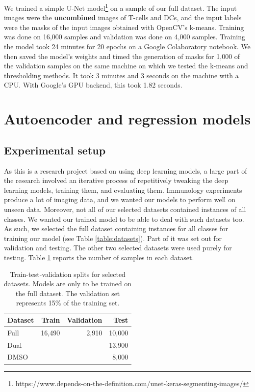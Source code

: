 We trained a simple U-Net model\footnote{https://www.depends-on-the-definition.com/unet-keras-segmenting-images/} on a sample of our full dataset. The input images were the \textbf{uncombined} images of T-cells and DCs, and the input labels were the masks of the input images obtained with OpenCV's k-means. Training was done on 16,000 samples and validation was done on 4,000 samples. Training the model took 24 minutes for 20 epochs on a Google Colaboratory notebook. We then saved the model's weights and timed the generation of masks for 1,000 of the validation samples on the same machine on which we tested the k-means and thresholding methods. It took 3 minutes and 3 seconds on the machine with a CPU. With Google's GPU backend, this took 1.82 seconds.

\section{Autoencoder and regression models}

\subsection{Experimental setup}

As this is a research project based on using deep learning models, a large part of the research involved an iterative process of repetitively tweaking the deep learning models, training them, and evaluating them. Immunology experiments produce a lot of imaging data, and we wanted our models to perform well on unseen data. Moreover, not all of our selected datasets contained instances of all classes. We wanted our trained model to be able to deal with such datasets too. As such, we selected the full dataset containing instances for all classes for training our model (see Table \ref{table:datasets}). Part of it was set out for validation and testing. The other two selected datasets were used purely for testing. Table \ref{table:splits} reports the number of samples in each dataset.

\begin{table}[h]
\centering
\caption{Train-test-validation splits for selected datasets. Models are only to be trained on the full dataset. The validation set represents 15\% of the training set.}
\begin{tabular}{|l|r|r|r|}
\hline
\rowcolor[HTML]{EFEFEF}
Dataset       & Train  & Validation & Test   \\ \hline
Full & 16,490 & 2,910      & 10,000 \\
Dual   &        &            & 13,900 \\
DMSO          &        &            & 8,000  \\ \hline
\end{tabular}
\label{table:splits}
\end{table}

